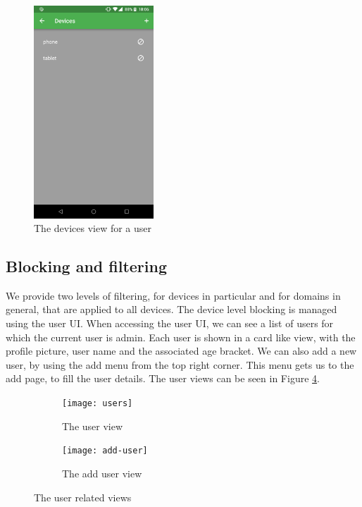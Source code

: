 \begin{figure}[th]
\centering
\includegraphics[width=0.4\textwidth]{Figures/devices}
\decoRule
\caption{The devices view for a user}
\label{fig:user-devices}
\end{figure}

\subsection{Blocking and filtering}

We provide two levels of filtering, for devices in particular and for domains in general, that are applied to all devices. The device level blocking is managed using the user UI. When accessing the user UI, we can see a list of users for which the current user is admin. Each user is shown in a card like view, with the profile picture, user name and the associated age bracket. We can also add a new user, by using the add menu from the top right corner. This menu gets us to the add page, to fill the user details. The user views can be seen in Figure \ref{fig:user-views}.

\begin{figure}
\centering
\begin{subfigure}{.5\textwidth}
  \centering
  \texttt{[image: users]}
  \caption{The user view}
  \label{fig:users}
\end{subfigure}%
\begin{subfigure}{.5\textwidth}
  \centering
  \texttt{[image: add-user]}
  \caption{The add user view}
  \label{fig:add-user}
\end{subfigure}
\caption{The user related views}
\label{fig:user-views}
\end{figure}

